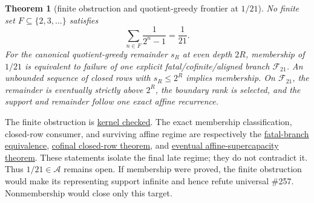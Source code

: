 \documentclass[11pt]{article}
\newcommand{\commit}{bb4e24651b37cd096d3749ef299c3317930b3a3b}
\newcommand{\repobase}{https://github.com/wcook04/plectis-lean-erdos249-257/blob/\commit}
\newcommand{\PK}{Erdos249257}
\newtheorem{theorem}{Theorem}[section]
\theoremstyle{definition}
\theoremstyle{remark}
\begin{document}
\begin{theorem}[finite obstruction and quotient-greedy frontier at \(1/21\)]
\label{res:twentyonefrontier}
No finite set \(F\subseteq\{2,3,\ldots\}\) satisfies
\[
 \sum_{n\in F}\frac1{2^n-1}=\frac1{21}.
\]
For the canonical quotient-greedy remainder \(s_R\) at even depth \(2R\),
membership of \(1/21\) is equivalent to failure of one explicit
fatal/cofinite/aligned branch \(\mathcal F_{21}\).  An unbounded sequence of
closed rows with \(s_R\le2^R\) implies membership.  On
\(\mathcal F_{21}\), the remainder is eventually strictly above \(2^R\), the
boundary rank is selected, and the support and remainder follow one exact
affine recurrence.
\end{theorem}
\noindent The finite obstruction is
\href{\repobase/ErdosProblems/Erdos257/HalfCounterexampleFrontier.lean\#L59}{kernel checked}.
The exact membership classification, closed-row consumer, and surviving
affine regime are respectively the
\href{\repobase/\PK/TwentyOneQuotientGreedy.lean\#L3508}{fatal-branch equivalence},
\href{\repobase/\PK/TwentyOneQuotientGreedy.lean\#L5553}{cofinal closed-row theorem},
and
\href{\repobase/\PK/TwentyOneQuotientGreedy.lean\#L5657}{eventual affine-supercapacity theorem}.
These statements isolate the final late regime; they do not contradict it.
Thus \(1/21\in\mathcal A\) remains open.  If membership were proved, the
finite obstruction would make its representing support infinite and hence
refute universal \#257.  Nonmembership would close only this target.
\end{document}
